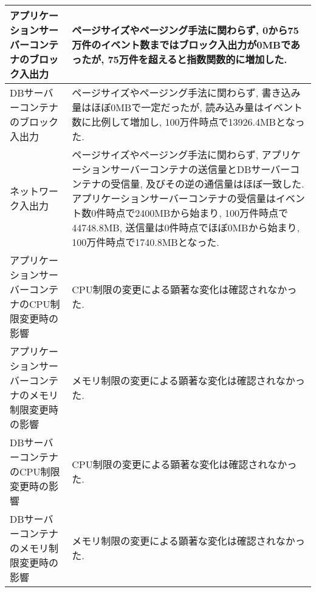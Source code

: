 \documentclass[../../../main]{subfiles}
\begin{document}
\begin{table}[H]
\begin{tabular}{|p{4cm}|p{10cm}|}
            アプリケーションサーバーコンテナのブロック入出力     & ページサイズやページング手法に関わらず, 0から75万件のイベント数まではブロック入出力が0MBであったが, 75万件を超えると指数関数的に増加した.                                                                                                                                                                        \\ \hline
            DBサーバーコンテナのブロック入出力           & ページサイズやページング手法に関わらず, 書き込み量はほぼ0MBで一定だったが, 読み込み量はイベント数に比例して増加し, 100万件時点で13926.4MBとなった.                                                                                                                                                                \\ \hline
            ネットワーク入出力                    & ページサイズやページング手法に関わらず, アプリケーションサーバーコンテナの送信量とDBサーバーコンテナの受信量, 及びその逆の通信量はほぼ一致した. アプリケーションサーバーコンテナの受信量はイベント数0件時点で2400MBから始まり, 100万件時点で44748.8MB, 送信量は0件時点でほぼ0MBから始まり, 100万件時点で1740.8MBとなった.                                                                  \\ \hline
            アプリケーションサーバーコンテナのCPU制限変更時の影響 & CPU制限の変更による顕著な変化は確認されなかった.                                                                                                                                                                                                                       \\ \hline
            アプリケーションサーバーコンテナのメモリ制限変更時の影響 & メモリ制限の変更による顕著な変化は確認されなかった.                                                                                                                                                                                                                       \\ \hline
            DBサーバーコンテナのCPU制限変更時の影響       & CPU制限の変更による顕著な変化は確認されなかった.                                                                                                                                                                                                                       \\ \hline
            DBサーバーコンテナのメモリ制限変更時の影響       & メモリ制限の変更による顕著な変化は確認されなかった.                                                                                                                                                                                                                       \\ \hline
        \end{tabular}
    \end{table}
\end{document}
